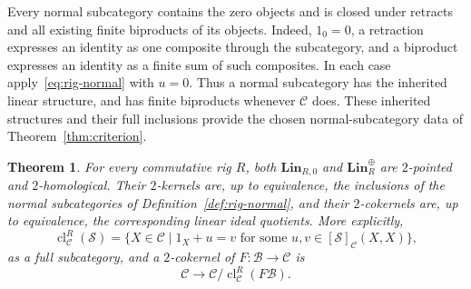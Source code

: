 \documentclass[11pt,reqno,a4paper]{amsart}
\newtheorem{theorem}{Theorem}[section]
\theoremstyle{definition}
\theoremstyle{remark}
\newcommand{\C}{\mathcal{C}}
\newcommand{\0}{\mathbf{0}}
\renewcommand{\1}{\mathbf{1}}
\newcommand{\B}{\mathcal B}
\newcommand{\Scl}{\mathcal S}
\DeclareMathOperator{\cl}{cl}
\begin{document}
Every normal subcategory contains the zero objects and is
closed under retracts and all existing finite biproducts of its
objects. Indeed, $1_0=0$, a retraction expresses an identity as
one composite through the subcategory, and a biproduct expresses
an identity as a finite sum of such composites. In each case
apply~\eqref{eq:rig-normal} with $u=0$. Thus a normal subcategory
has the inherited linear structure, and has finite biproducts
whenever $\C$ does. These inherited structures and their full
inclusions provide the chosen normal-subcategory data of
Theorem~\ref{thm:criterion}.

\begin{theorem}\label{thm:rig-linear}
For every commutative rig $R$, both $\mathbf{Lin}_{R,0}$ and
$\mathbf{Lin}_{R}^{\oplus}$ are $2$-pointed and
$2$-homological. Their $2$-kernels are, up to equivalence, the
inclusions of the normal subcategories of
Definition~\ref{def:rig-normal}, and their $2$-cokernels are,
up to equivalence, the corresponding linear ideal quotients.
More explicitly,
\begin{equation}\label{eq:rig-closure}
 \cl^{R}_{\C}(\Scl)
 =\{X\in\C\mid 1_X+u=v
       \text{ for some }u,v\in[\Scl]_{\C}(X,X)\},
\end{equation}
as a full subcategory, and a $2$-cokernel of $F:\B\to\C$ is
\[
 \C\longrightarrow\C/\cl^{R}_{\C}(F\B).
\]
\end{theorem}
\end{document}
